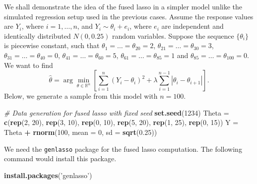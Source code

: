 \documentclass[
]{book}
\newenvironment{Shaded}{\begin{snugshade}}{\end{snugshade}}
\newcommand{\CommentTok}[1]{\textcolor[rgb]{0.56,0.35,0.01}{\textit{#1}}}
\newcommand{\DataTypeTok}[1]{\textcolor[rgb]{0.13,0.29,0.53}{#1}}
\newcommand{\DecValTok}[1]{\textcolor[rgb]{0.00,0.00,0.81}{#1}}
\newcommand{\FloatTok}[1]{\textcolor[rgb]{0.00,0.00,0.81}{#1}}
\newcommand{\KeywordTok}[1]{\textcolor[rgb]{0.13,0.29,0.53}{\textbf{#1}}}
\newcommand{\NormalTok}[1]{#1}
\newcommand{\OperatorTok}[1]{\textcolor[rgb]{0.81,0.36,0.00}{\textbf{#1}}}
\newcommand{\StringTok}[1]{\textcolor[rgb]{0.31,0.60,0.02}{#1}}
\begin{document}
We shall demonstrate the idea of the fused lasso in a simpler model unlike the simulated regression setup used in the previous cases. Assume the response values are \(Y_i\), where \(i = 1, \ldots, n\), and \(Y_i \sim \theta_i + e_i\), where \(e_i\) are independent and identically distributed \(N(0, 0.25)\) random variables. Suppose the sequence \(\{\theta_i\}\) is piecewise constant, such that \(\theta_1 = \ldots = \theta_{20} = 2\), \(\theta_{21} = \ldots = \theta_{30} = 3\), \(\theta_{31} = \ldots = \theta_{40} = 0\), \(\theta_{41} = \ldots = \theta_{60} = 5\), \(\theta_{61} = \ldots = \theta_{85} = 1\) and \(\theta_{85} = \ldots = \theta_{100} = 0\). We want to find
\[\hat{\theta} = \arg\min_{\theta \in \mathbb{R}^n} \left[ \sum_{i=1}^n (Y_i - \theta_i)^2 + \lambda \sum_{i=1}^{n-1} | \theta_i - \theta_{i+1} | \right].\]
Below, we generate a sample from this model with \(n = 100\).

\begin{Shaded}
\begin{Highlighting}[]
\CommentTok{# Data generation for fused lasso with fixed seed}
\KeywordTok{set.seed}\NormalTok{(}\DecValTok{1234}\NormalTok{)}
\NormalTok{Theta =}\StringTok{ }\KeywordTok{c}\NormalTok{(}\KeywordTok{rep}\NormalTok{(}\DecValTok{2}\NormalTok{, }\DecValTok{20}\NormalTok{), }\KeywordTok{rep}\NormalTok{(}\DecValTok{3}\NormalTok{, }\DecValTok{10}\NormalTok{), }\KeywordTok{rep}\NormalTok{(}\DecValTok{0}\NormalTok{, }\DecValTok{10}\NormalTok{), }\KeywordTok{rep}\NormalTok{(}\DecValTok{5}\NormalTok{, }\DecValTok{20}\NormalTok{),}
          \KeywordTok{rep}\NormalTok{(}\DecValTok{1}\NormalTok{, }\DecValTok{25}\NormalTok{), }\KeywordTok{rep}\NormalTok{(}\DecValTok{0}\NormalTok{, }\DecValTok{15}\NormalTok{))}
\NormalTok{Y =}\StringTok{ }\NormalTok{Theta }\OperatorTok{+}\StringTok{ }\KeywordTok{rnorm}\NormalTok{(}\DecValTok{100}\NormalTok{, }\DataTypeTok{mean =} \DecValTok{0}\NormalTok{, }\DataTypeTok{sd =} \KeywordTok{sqrt}\NormalTok{(}\FloatTok{0.25}\NormalTok{))}
\end{Highlighting}
\end{Shaded}

We need the \texttt{genlasso} package \citep{R-genlasso} for the fused lasso computation. The following command would install this package.

\begin{Shaded}
\begin{Highlighting}[]
\KeywordTok{install.packages}\NormalTok{(}\StringTok{'genlasso'}\NormalTok{)}
\end{Highlighting}
\end{Shaded}
\end{document}
